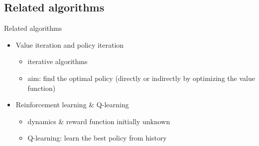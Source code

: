 \documentclass{beamer}
\begin{document}
\subsection{Related algorithms}
\begin{frame}{Related algorithms}
\begin{itemize}
\item Value iteration and policy iteration
\begin{itemize}
\item iterative algorithms
\item aim: find the optimal policy (directly or indirectly by optimizing the value function)
\end{itemize}
\item Reinforcement learning \& Q-learning
\begin{itemize}
\item dynamics \& reward function initially unknown
\item Q-learning: learn the best policy from history
\end{itemize}
\end{itemize}
\end{frame}
\end{document}
